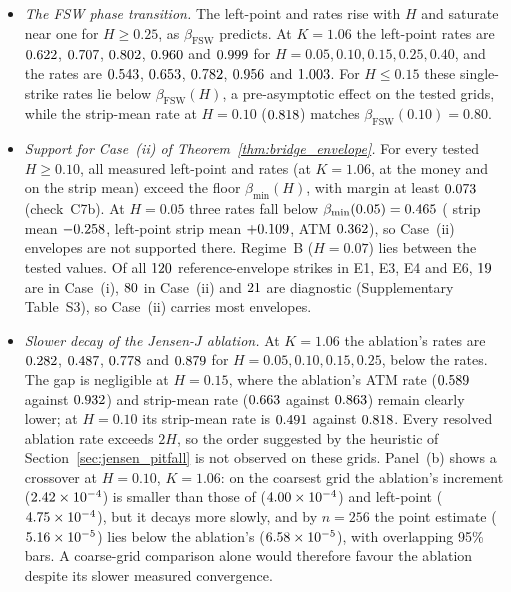 \begin{itemize}
  \item \emph{The FSW phase transition.} The left-point and \RCCE{} rates rise with $H$ and saturate near one for $H\ge 0.25$, as $\beta_{\mathrm{FSW}}$ predicts. At $K=1.06$ the left-point rates are $0.622$, $0.707$, $0.802$, $0.960$ and $0.999$ for $H=0.05,0.10,0.15,0.25,0.40$, and the \RCCE{} rates are $0.543$, $0.653$, $0.782$, $0.956$ and $1.003$. For $H\le0.15$ these single-strike rates lie below $\beta_{\mathrm{FSW}}(H)$, a pre-asymptotic effect on the tested grids, while the \RCCE{} strip-mean rate at $H=0.10$ ($0.818$) matches $\beta_{\mathrm{FSW}}(0.10)=0.80$.
  \item \emph{Support for Case~(ii) of Theorem~\ref{thm:bridge_envelope}.} For every tested $H\ge0.10$, all measured left-point and \RCCE{} rates (at $K=1.06$, at the money and on the strip mean) exceed the floor $\beta_{\min}(H)$, with margin at least $0.073$ (check~C7b). At $H=0.05$ three rates fall below $\beta_{\min}(0.05)=0.465$ (\RCCE{} strip mean $-0.258$, left-point strip mean $+0.109$, \RCCE{} ATM $0.362$), so Case~(ii) envelopes are not supported there. Regime~B ($H=0.07$) lies between the tested values. Of all $120$ reference-envelope strikes in E1, E3, E4 and E6, $19$ are in Case~(i), $80$ in Case~(ii) and $21$ are diagnostic (Supplementary Table~S3), so Case~(ii) carries most envelopes.
  \item \emph{Slower decay of the Jensen-$J$ ablation.} At $K=1.06$ the ablation's rates are $0.282$, $0.487$, $0.778$ and $0.879$ for $H=0.05,0.10,0.15,0.25$, below the \RCCE{} rates. The gap is negligible at $H=0.15$, where the ablation's ATM rate ($0.589$ against $0.932$) and strip-mean rate ($0.663$ against $0.863$) remain clearly lower; at $H=0.10$ its strip-mean rate is $0.491$ against $0.818$. Every resolved ablation rate exceeds $2H$, so the order suggested by the heuristic of Section~\ref{sec:jensen_pitfall} is not observed on these grids. Panel~(b) shows a crossover at $H=0.10$, $K=1.06$: on the coarsest grid the ablation's increment ($2.42\times 10^{-4}$) is smaller than those of \RCCE{} ($4.00\times 10^{-4}$) and left-point ($4.75\times 10^{-4}$), but it decays more slowly, and by $n=256$ the \RCCE{} point estimate ($5.16\times 10^{-5}$) lies below the ablation's ($6.58\times 10^{-5}$), with overlapping 95\% bars. A coarse-grid comparison alone would therefore favour the ablation despite its slower measured convergence.
\end{itemize}

\FloatBarrier
